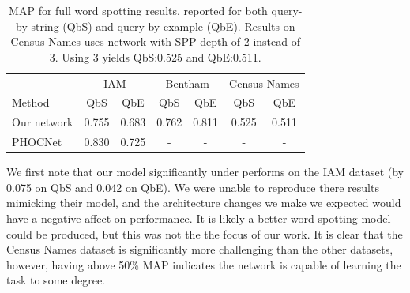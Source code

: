 \documentclass[ms,electronic,twosidetoc,letterpaper,chaptercenter,parttop,lol,lof,lot]{byumsphd}
\begin{document}
\begin{table}
\centering
\begin{tabular}{| l | c  c | c c | c c |}
  \hline
   & \multicolumn{2}{c|}{IAM} & \multicolumn{2}{c|}{Bentham} & \multicolumn{2}{c|}{Census Names}\\
  Method & QbS & QbE & QbS & QbE & QbS & QbE\\
  \hline			
  Our network & 0.755 & 0.683 & 0.762 & 0.811 & 0.525 & 0.511  %
  \\
  PHOCNet\cite{sudholt2016} & 0.830 & 0.725 & - & - & - & - \\
  \hline  
\end{tabular}
\caption{MAP for full word spotting results, reported for both query-by-string (QbS) and query-by-example (QbE). Results on Census Names uses network with SPP depth of 2 instead of 3. Using 3 yields QbS:0.525 and QbE:0.511.}
\label{tab:wordspottingresults}
\end{table}



We first note that our model significantly under performs \cite{sudholt2016} on the IAM dataset (by 0.075 on QbS and 0.042 on QbE). We were unable to reproduce there results mimicking their model, and the architecture changes we make we expected would have a negative affect on performance. It is likely a better word spotting model could be produced, but this was not the the focus of our work.
It is clear that the Census Names dataset is significantly more challenging than the other datasets, however, having above 50\% MAP indicates the network is capable of learning the task to some degree.
\end{document}
